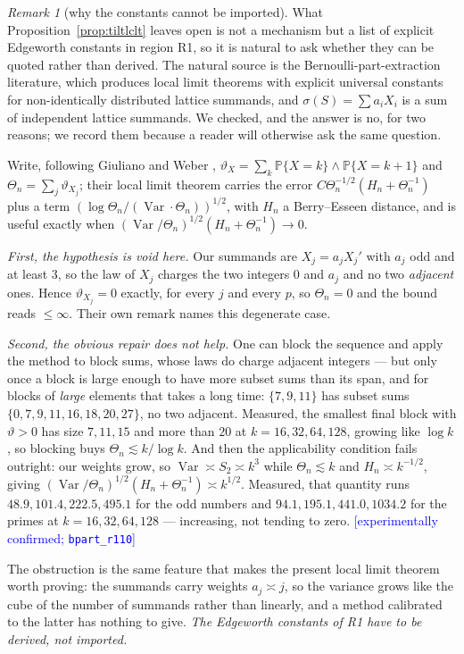 \documentclass[11pt,a4paper]{article}
\theoremstyle{plain}
\theoremstyle{definition}
\theoremstyle{remark}
\newtheorem{remark}[theorem]{Remark}
\newcommand{\STATUS}[1]{\textcolor{blue}{\textsf{[#1]}}}
\begin{document}
\begin{remark}[why the constants cannot be imported]\label{rem:closing}
What Proposition~\ref{prop:tiltlclt} leaves open is not a mechanism but a list of explicit
Edgeworth constants in region R1, so it is natural to ask whether they can be quoted rather
than derived. The natural source is the Bernoulli-part-extraction literature, which produces
local limit theorems with explicit universal constants for non-identically distributed lattice
summands, and $\sigma(S)=\sum a_iX_i$ is a sum of independent lattice summands. We checked,
and the answer is no, for two reasons; we record them because a reader will otherwise ask the
same question.

Write, following Giuliano and Weber \cite{GW},
$\vartheta_X=\sum_k\mathbb{P}\{X=k\}\wedge\mathbb{P}\{X=k+1\}$ and
$\Theta_n=\sum_j\vartheta_{X_j}$; their local limit theorem carries the error
$C\Theta_n^{-1/2}(H_n+\Theta_n^{-1})$ plus a term
$(\log\Theta_n/(\operatorname{Var}\cdot\Theta_n))^{1/2}$, with $H_n$ a Berry--Esseen distance,
and is useful exactly when
$(\operatorname{Var}/\Theta_n)^{1/2}(H_n+\Theta_n^{-1})\to0$.

\emph{First, the hypothesis is void here.} Our summands are $X_j=a_jX_j'$ with $a_j$ odd and
at least $3$, so the law of $X_j$ charges the two integers $0$ and $a_j$ and no two
\emph{adjacent} ones. Hence $\vartheta_{X_j}=0$ exactly, for every $j$ and every $p$, so
$\Theta_n=0$ and the bound reads $\le\infty$. Their own remark names this degenerate case.

\emph{Second, the obvious repair does not help.} One can block the sequence and apply the
method to block sums, whose laws do charge adjacent integers --- but only once a block is
large enough to have more subset sums than its span, and for blocks of \emph{large} elements
that takes a long time: $\{7,9,11\}$ has subset sums $\{0,7,9,11,16,18,20,27\}$, no two
adjacent. Measured, the smallest final block with $\vartheta>0$ has size $7,11,15$ and more
than $20$ at $k=16,32,64,128$, growing like $\log k$, so blocking buys $\Theta_n\lesssim
k/\log k$. And then the applicability condition fails outright: our weights grow, so
$\operatorname{Var}\asymp S_2\asymp k^{3}$ while $\Theta_n\lesssim k$ and $H_n\asymp
k^{-1/2}$, giving $(\operatorname{Var}/\Theta_n)^{1/2}(H_n+\Theta_n^{-1})\asymp k^{1/2}$.
Measured, that quantity runs $48.9,101.4,222.5,495.1$ for the odd numbers and
$94.1,195.1,441.0,1034.2$ for the primes at $k=16,32,64,128$ --- increasing, not tending to
zero. \STATUS{experimentally confirmed; \texttt{bpart\_r110}}

The obstruction is the same feature that makes the present local limit theorem worth proving:
the summands carry weights $a_j\asymp j$, so the variance grows like the cube of the number of
summands rather than linearly, and a method calibrated to the latter has nothing to give.
\emph{The Edgeworth constants of R1 have to be derived, not imported.}
\end{remark}
\end{document}
